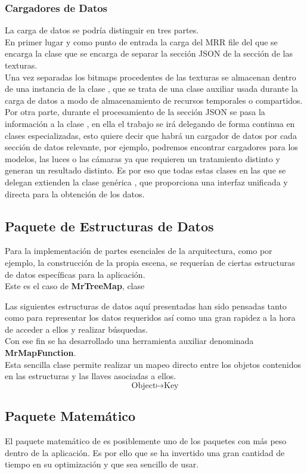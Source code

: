 \subsubsection{Cargadores de Datos}
La carga de datos se podría distinguir en tres partes.\\
En primer lugar y como punto de entrada la carga del MRR file del que se encarga la clase \rorefmrrloader que se encarga de separar la sección JSON de la sección de las texturas.\\
Una vez separadas los bitmaps procedentes de las texturas se almacenan dentro de una instancia de la clase \rorefresources, que se trata de una clase auxiliar usada durante la carga de datos a modo de almacenamiento de recursos temporales o compartidos.\\
Por otra parte, durante el procesamiento de la sección JSON se pasa la información a la clase \rorefrobottojsonloader, en ella el trabajo se irá delegando de forma continua en clases especializadas, esto quiere decir que habrá un cargador de datos por cada sección de datos relevante, por ejemplo, podremos encontrar cargadores para los modelos, las luces o las cámaras ya que requieren un tratamiento distinto y generan un resultado distinto. Es por eso que todas estas clases en las que se delegan extienden la clase genérica \rorefjsonbaseloader, que proporciona una interfaz unificada y directa para la obtención de los datos. 

\subsection{Paquete de Estructuras de Datos}
Para la implementación de partes esenciales de la arquitectura, como por ejemplo, la construcción de la propia escena, se requerían de ciertas estructuras de datos específicas para la aplicación.\\
Este es el caso de \textbf{MrTreeMap}, clase 

Las siguientes estructuras de datos aquí presentadas han sido pensadas tanto como para representar los datos requeridos así como una gran rapidez a la hora de acceder a ellos y realizar búsquedas.\\
Con ese fin se ha desarrollado una herramienta auxiliar denominada \textbf{MrMapFunction}.\\
Esta sencilla clase permite realizar un mapeo directo entre los objetos contenidos en las estructuras y las llaves asociadas a ellos.
$$\text{Object}\mapsto \text{Key}$$

\subsection{Paquete Matemático}
El paquete matemático de \robotto es posiblemente uno de los paquetes con más peso dentro de la aplicación. Es por ello que se ha invertido una gran cantidad de tiempo en su optimización y que sea sencillo de usar.\\

